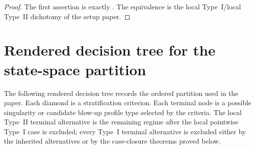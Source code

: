 \documentclass[11pt]{amsart}
\numberwithin{equation}{section}
\theoremstyle{plain}
\theoremstyle{definition}
\theoremstyle{remark}
\begin{document}
\begin{proof}
The first assertion is exactly .  The
equivalence is the local Type~I/local Type~II dichotomy of the setup paper.
\end{proof}

\section{Rendered decision tree for the state-space partition}
\label{sec:mermaid-decision-tree}

The following rendered decision tree records the ordered partition used in the
paper.  Each diamond is a stratification criterion.  Each terminal node is a
possible singularity or candidate blow-up profile type selected by the criteria.
The local Type~II terminal alternative is the remaining regime after the local
pointwise Type~I case is excluded; every Type~I terminal alternative is
excluded either by the inherited alternatives or by the case-closure
theorems proved below.
\end{document}
